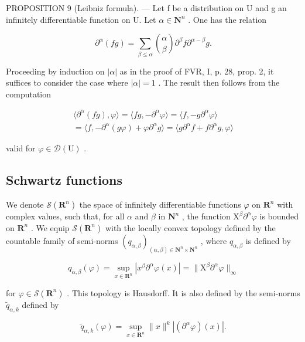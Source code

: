 PROPOSITION 9 (Leibniz formula). --- Let f be a distribution on U and g an infinitely differentiable function on U. Let \(\alpha \in \mathbf{N}^n\) . One has the relation

\[
\partial^ {\alpha} (f g) = \sum_ {\beta \leqslant \alpha} \binom {\alpha} {\beta} \partial^ {\beta} f   \partial^ {\alpha - \beta} g.
\]

Proceeding by induction on \(|\alpha|\) as in the proof of FVR, I, p. 28, prop. 2, it suffices to consider the case where \(|\alpha|=1\) . The result then follows from the computation

\[
\begin{array}{c} \langle \partial^ {\alpha} (f g), \varphi \rangle = \langle f g, - \partial^ {\alpha} \varphi \rangle = \langle f, - g \partial^ {\alpha} \varphi \rangle \\ = \langle f, - \partial^ {\alpha} (g \varphi) + \varphi \partial^ {\alpha} g \rangle = \langle g \partial^ {\alpha} f + f \partial^ {\alpha} g, \varphi \rangle \end{array}
\]

valid for \(\varphi\in\mathcal{D}(\mathrm{U})\) .

\subsection{Schwartz functions}

We denote \(\mathcal{S}(\mathbf{R}^{n})\) the space of infinitely differentiable functions \(\varphi\) on \(\mathbf{R}^{n}\) with complex values, such that, for all \(\alpha\) and \(\beta\) in \(\mathbf{N}^{n}\) , the function \(\mathrm{X}^{\beta}\partial^{\alpha}\varphi\) is bounded on \(\mathbf{R}^{n}\) . We equip \(\mathcal{S}(\mathbf{R}^{n})\) with the locally convex topology defined by the countable family of semi-norms \((q_{\alpha,\beta})_{(\alpha,\beta)\in\mathbf{N}^{n}\times\mathbf{N}^{n}}\) , where \(q_{\alpha,\beta}\) is defined by

\[
q _ {\alpha , \beta} (\varphi) = \sup _ {x \in \mathbf {R} ^ {n}} | x ^ {\beta} \partial^ {\alpha} \varphi (x) | = \| \mathrm{X} ^ {\beta} \partial^ {\alpha} \varphi \| _ {\infty}
\]

for \(\varphi\in\mathcal{S}(\mathbf{R}^{n})\) . This topology is Hausdorff. It is also defined by the semi-norms \(\widetilde{q}_{\alpha,k}\) defined by

\[
\widetilde {q} _ {\alpha , k} (\varphi) = \sup _ {x \in \mathbf {R} ^ {n}} \| x \| ^ {k} | (\partial^ {\alpha} \varphi) (x) |.
\]

